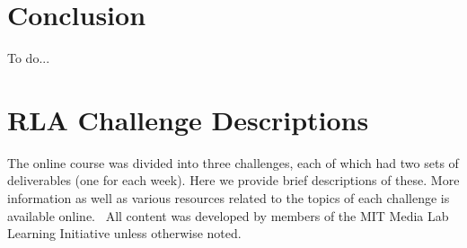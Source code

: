 \documentclass[12pt,twoside,vi]{mitthesis}
\newcommand{\wip}[1]{{\color{red} To do...}}
\begin{document}
\chapter{Conclusion}

\wip{narrative summary of thesis, an honest set of personal takeaways (from which reader can judge whether to replicate work) and feeligns about future work}

\appendix

\chapter{RLA Challenge Descriptions}

The online course was divided into three challenges, each of which had two sets of deliverables (one for each week). Here we provide brief descriptions of these. More information as well as various resources related to the topics of each challenge is available online.~\cite{rla} All content was developed by members of the MIT Media Lab Learning Initiative unless otherwise noted.
\end{document}
